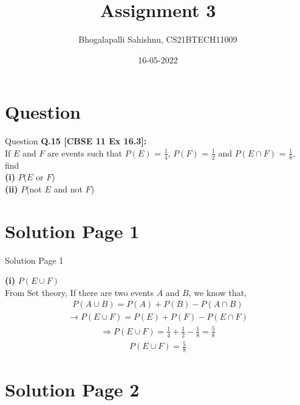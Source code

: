 \documentclass{beamer}
\title{Assignment 3}
\author{Bhogalapalli Sahishnu, CS21BTECH11009}
\date{16-05-2022}
\begin{document}
\begin{frame}
    \titlepage
\end{frame}

\section{Question}

\begin{frame}{Question}
    \textbf{Q.15 [CBSE 11 Ex 16.3]:}\\
    If $E$ and $F$ are events such that $P(E)$ = $\frac{1}{4}$, $P(F)$ = $\frac{1}{2}$ and $P(E\cap F)$ = $\frac{1}{8}$, find\\
\textbf{(i)} $P$($E$ or $F$)\\
\textbf{(ii)} $P$(not $E$ and not $F$)\\
\end{frame}

\section{Solution Page 1}

\begin{frame}{Solution Page 1}

\textbf{(i)} $P(E \cup F)$\\
From Set theory, If there are two events $A$ and $B$, we know that,
\begin{align}
    P(A\cup B) = P(A) + P(B) - P(A\cap B)
\end{align}
\begin{align}
    \rightarrow P(E \cup F) = P(E) + P(F) - P(E \cap F)
\end{align}
\begin{align}
    \Rightarrow P(E \cup F) = \frac{1}{4} + \frac{1}{2} - \frac{1}{8} = \frac{5}{8}
\end{align}
\begin{align}
    \boxed{P(E \cup F) = \frac{5}{8}}  
\end{align}
    
\end{frame}

\section{Solution Page 2}
\end{document}
